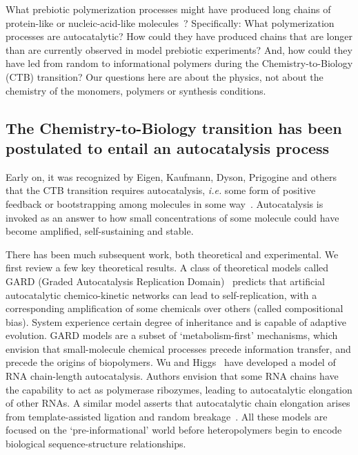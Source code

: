 \documentclass[5p,times]{elsarticle}
\begin{document}
 What prebiotic polymerization processes might have produced long chains of protein-like or 
nucleic-acid-like molecules~\cite{Joyce1987,Abel2005}?  Specifically: What polymerization processes 
are autocatalytic?  How could they have produced chains that are longer than are currently observed 
in model prebiotic experiments?  And, how could they have led from random to informational polymers 
during the Chemistry-to-Biology (CTB) transition?  Our questions here are about the physics, not 
about the chemistry of the monomers, polymers or synthesis conditions.  
 
 \subsection{The Chemistry-to-Biology transition has been postulated to entail an autocatalysis 
process}
 
 Early on, it was recognized by Eigen, Kaufmann, Dyson, Prigogine and others that the CTB transition 
requires autocatalysis, \emph{i.e.} some form of positive feedback or bootstrapping among molecules 
in some 
way~\cite{eigen1971selforganization,Eigen1977,Eigen1978,Dyson1985,Prigogine1989,Kauffman1986}.  
Autocatalysis is invoked as an answer to how small concentrations of some molecule could have become 
amplified, self-sustaining and stable.
 
 There has been much subsequent work, both theoretical and experimental.  We first review a few key 
theoretical results.  A class of theoretical models called GARD (Graded Autocatalysis Replication 
Domain)~\cite{segre1998graded,Segre2000,Markovitch2012} predicts that artificial autocatalytic 
chemico-kinetic networks can lead to self-replication, with a corresponding amplification of some 
chemicals over others (called compositional bias). System experience certain degree of inheritance 
and is capable of adaptive evolution.  GARD models are a subset of `metabolism-first' mechanisms, 
which envision that small-molecule chemical processes precede information transfer, and precede the 
origins of biopolymers.  Wu and Higgs~\cite{Wu2009} have developed a model of RNA chain-length 
autocatalysis.  Authors envision that some RNA chains have the capability to act as polymerase 
ribozymes, leading to autocatalytic elongation of other RNAs.  A similar model asserts that 
autocatalytic chain elongation arises from template-assisted ligation and random 
breakage~\cite{Tkachenko2014}.  All these models are focused on the `pre-informational' world before 
heteropolymers begin to encode biological sequence-structure relationships.  
 
\end{document}
